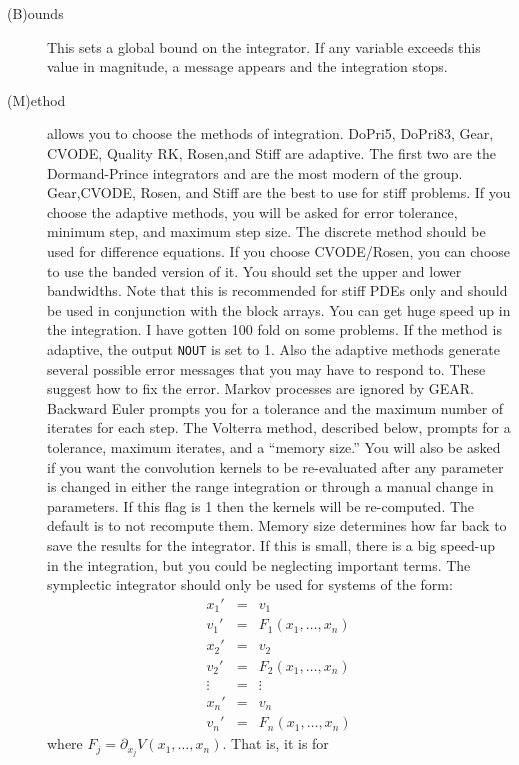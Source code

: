 \documentclass{article}
\newcommand{\tc}[1]{\addcontentsline{toc}{subsection}{#1}}
\begin{document}
\begin{description}
\item[(B)ounds]  This sets a global bound on the integrator.  If any variable exceeds
 this value in magnitude, a message appears and the integration stops.
\tc{Numerical method}\item[(M)ethod]  allows you to choose the methods of integration.
DoPri5, DoPri83, Gear, CVODE, Quality RK, Rosen,and Stiff  are
 adaptive. The first two are the Dormand-Prince integrators and are
the most modern of the group.
 Gear,CVODE, Rosen, and Stiff are the best to use for stiff problems.  If you choose
the adaptive methods, you will be
 asked for error tolerance, minimum step, and maximum step size.  The discrete
 method should be used for difference equations.
If you choose CVODE/Rosen, you can choose to use the banded version of
it. You should set the upper and lower bandwidths. Note that this is
recommended for stiff PDEs only and should be used in conjunction with
the block arrays.
You can get huge speed up in the integration. I have gotten 100
fold on some problems. If the method is
adaptive, the
 output {\tt NOUT} is set to 1.  Also the adaptive methods generate several possible error messages
 that you may have to respond to.  These suggest how to fix the error.
 Markov processes are ignored by GEAR.
 Backward Euler prompts you for a tolerance and the maximum number of iterates
 for each step. The Volterra method, described below, prompts for
a tolerance, maximum iterates, and a ``memory size.''   You will also
be asked if you want the convolution kernels to be re-evaluated after
any parameter is changed in either the range integration or through a
manual change in parameters.  If this flag is 1 then the kernels will
be re-computed.  The default is to not recompute them. Memory size
determines how far back to save the results for the integrator. If
this is small, there is a big speed-up in the integration, but you
could be neglecting important terms.  The symplectic integrator should
only be used for systems of the form:
\begin{eqnarray*}
x_1' &=& v_1 \\
v_1' &=& F_1(x_1,\ldots,x_n) \\
x_2' &=& v_2 \\
v_2' &=& F_2(x_1,\ldots,x_n) \\
\vdots &=& \vdots \\
x_n' &=& v_n \\
v_n' &=& F_n(x_1,\ldots,x_n)
\end{eqnarray*}
where $F_j = \partial_{x_j} V(x_1,\ldots,x_n).$  That is, it is for

\end{description}
\end{document}

